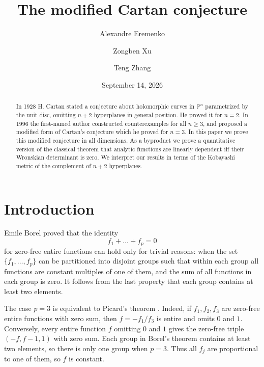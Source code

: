 \documentclass[12pt,letterpaper,reqno]{amsart}
\theoremstyle{definition}
\numberwithin{equation}{section}
\newcommand{\PP}{\mathbb P}
\begin{document}
	\title{The modified Cartan conjecture}
	\author[A.~Eremenko]{Alexandre Eremenko}
	\address{Mathematics Department, Purdue University,
		West Lafayette, IN 47907, USA}
	\author[Z.~Xu]{Zongben Xu}
	\address{School of Mathematics and Statistics, Xi'an Jiaotong University,
		Xi'an 710049, P.~R.~China}
	\author[T.~Zhang]{Teng Zhang}
	\address{School of Mathematics and Statistics, Xi'an Jiaotong University,
		Xi'an 710049, P.~R.~China}
	\date{September 14, 2026}
	\begin{abstract}
		In 1928 H. Cartan stated a conjecture about holomorphic curves in $\PP^n$
		parametrized by the unit disc, omitting $n+2$ hyperplanes in general position.
		He proved it for $n=2$. In 1996 the first-named author constructed
		counterexamples for all $n\geq 3$, and proposed a modified form of Cartan's
		conjecture which he proved for $n=3$.
		In this paper we prove this modified conjecture in all dimensions.
		As a byproduct we prove a quantitative version of the classical theorem that
		analytic functions are linearly dependent iff their Wronskian determinant is
		zero. We interpret our results in
		terms of the Kobayashi metric of the complement of $n+2$ hyperplanes.
	\end{abstract}
	\maketitle
	
	\section{Introduction}
	
	Emile Borel \cite{Bor97} proved that the identity
	$$f_1+\ldots+f_p=0$$
	for zero-free entire functions can hold only for trivial reasons:
	when the set $\{ f_1,\ldots,f_p\}$ can be partitioned into disjoint groups
	such that within each group all functions are constant multiples
	of one of them,
	and the sum of all functions in each group is zero.
	It follows from the last property that
	each group contains at least two elements.
	
	The case $p=3$ is equivalent to Picard's theorem \cite{Pic79}. Indeed, if
	$f_1,f_2,f_3$ are zero-free entire functions with zero sum, then
	$f=-f_1/f_3$ is entire and omits $0$ and $1$. Conversely, every
	entire function $f$ omitting $0$ and $1$ gives the zero-free triple
	$(-f,f-1,1)$ with zero sum. Each group in Borel's theorem contains
	at least two elements, so there is only one group when $p=3$.
	Thus all $f_j$ are proportional to one of them, so $f$ is constant.
	
\end{document}
